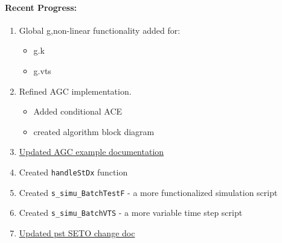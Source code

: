 \documentclass[12pt]{article}
\begin{document}
\begin{multicols}{2}
\raggedright

\paragraph{Recent Progress:}
	\begin{enumerate}
		\itemsep0em 
		\item Global g,non-linear functionality added for: %
		\begin{minipage}{\linewidth}
		\begin{multicols}{2}
				\begin{itemize}
		\itemsep0em 
				\footnotesize
				\raggedright
					\item g.k
					\item g.vts
				\end{itemize}
		\end{multicols}
		\end{minipage}
		
		\item Refined AGC implementation.
				\begin{minipage}{\linewidth}
								\begin{itemize}
						\itemsep0em 
								\footnotesize
						\item Added conditional ACE
						\item created algorithm block diagram
									
								\end{itemize}
						\end{minipage}
		\item \href{https://github.com/thadhaines/MT-Tech-SETO/blob/master/researchDocs/TEX/one-offs/200720-PSTandAGC/200720-PSTandAGC.pdf}
				{Updated AGC example documentation}
\item Created \verb|handleStDx| function
\item Created \verb|s_simu_BatchTestF| - a more functionalized	simulation script
\item Created \verb|s_simu_BatchVTS| - a more variable time step script
	\item \href{https://github.com/thadhaines/MT-Tech-SETO/blob/master/researchDocs/TEX/one-offs/200709-PSTsetoVersionChanges/200709-PSTsetoVersionChanges.pdf}
		{Updated pst SETO change doc}
		

\end{enumerate}
\end{multicols}
\end{document}
